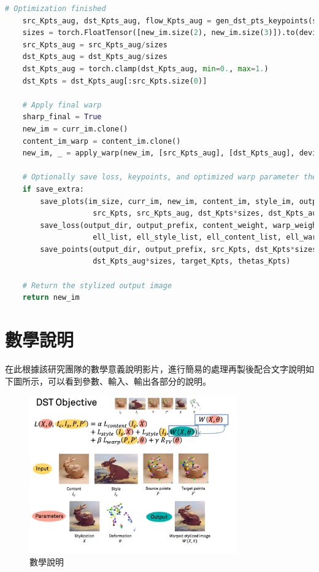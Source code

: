 \documentclass[10pt,UTF8]{ctexart}
\begin{document}
\begin{lstlisting}[language={python}]
    # Optimization finished
    src_Kpts_aug, dst_Kpts_aug, flow_Kpts_aug = gen_dst_pts_keypoints(src_Kpts, thetas_Kpts, no_flow_Kpts, border_Kpts)
    sizes = torch.FloatTensor([new_im.size(2), new_im.size(3)]).to(device)
    src_Kpts_aug = src_Kpts_aug/sizes
    dst_Kpts_aug = dst_Kpts_aug/sizes
    dst_Kpts_aug = torch.clamp(dst_Kpts_aug, min=0., max=1.)
    dst_Kpts = dst_Kpts_aug[:src_Kpts.size(0)]

    # Apply final warp
    sharp_final = True
    new_im = curr_im.clone()
    content_im_warp = content_im.clone()
    new_im, _ = apply_warp(new_im, [src_Kpts_aug], [dst_Kpts_aug], device, sharp=sharp_final)

    # Optionally save loss, keypoints, and optimized warp parameter thetas
    if save_extra:
        save_plots(im_size, curr_im, new_im, content_im, style_im, output_dir, output_prefix, style_path, style_pts_path, colors,
                    src_Kpts, src_Kpts_aug, dst_Kpts*sizes, dst_Kpts_aug, target_Kpts, target_Kpts_o, border_Kpts, device)
        save_loss(output_dir, output_prefix, content_weight, warp_weight, reg_weight, max_iter, scale_list,
                    ell_list, ell_style_list, ell_content_list, ell_warp_list, ell_warp_TV_list)
        save_points(output_dir, output_prefix, src_Kpts, dst_Kpts*sizes, src_Kpts_aug*sizes,
                    dst_Kpts_aug*sizes, target_Kpts, thetas_Kpts)

    # Return the stylized output image
    return new_im
\end{lstlisting}

\section{數學說明}

在此根據該研究團隊的數學意義說明影片，進行簡易的處理再製後配合文字說明如下圖所示，可以看到參數、輸入、輸出各部分的說明。

\begin{figure}[H]
\centering 
\includegraphics[width=0.80\textwidth]{m1.png} 
\caption{數學說明}
\label{Test}
\end{figure}
\end{document}
